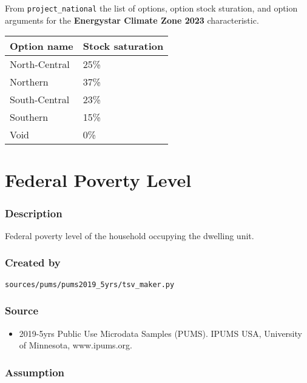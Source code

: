 From \texttt{project\_national} the list of options, option stock
sturation, and option arguments for the \textbf{Energystar Climate Zone
2023} characteristic.

\begin{longtable}[]{@{}ll@{}}
\toprule\noalign{}
Option name & Stock saturation \\
\midrule\noalign{}
\endhead
\bottomrule\noalign{}
\endlastfoot
North-Central & 25\% \\
Northern & 37\% \\
South-Central & 23\% \\
Southern & 15\% \\
Void & 0\% \\
\end{longtable}

\section{Federal Poverty Level}\label{federal_poverty_level}

\subsubsection{Description}\label{description-41}

Federal poverty level of the household occupying the dwelling unit.

\subsubsection{Created by}\label{created-by-41}

\texttt{sources/pums/pums2019\_5yrs/tsv\_maker.py}

\subsubsection{Source}\label{source-40}

\begin{itemize}
 
\item
  2019-5yrs Public Use Microdata Samples (PUMS). IPUMS USA, University
  of Minnesota, www.ipums.org.
\end{itemize}

\subsubsection{Assumption}\label{assumption-22}

